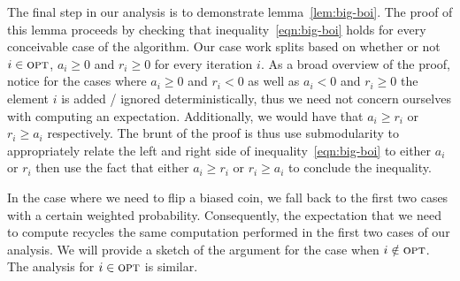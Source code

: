 \documentclass{article}
\begin{document}
The final step in our analysis is to demonstrate lemma~\ref{lem:big-boi}. The proof of this lemma proceeds by checking that inequality~\ref{eqn:big-boi} holds for every conceivable case of the algorithm. Our case work splits based on whether or not $i \in \textup{\textsc{opt}}$, $a_i \geq 0$ and $r_i \geq 0$ for every iteration $i$. As a broad overview of the proof, notice for the cases where $a_i \geq 0$ and $r_i < 0$ as well as $a_i < 0$ and $r_i \geq 0$ the element $i$ is added / ignored deterministically, thus we need not concern ourselves with computing an expectation. Additionally, we would have that $a_i \geq r_i$ or $r_i \geq a_i$ respectively. The brunt of the proof is thus use submodularity to appropriately relate the left and right side of inequality~\ref{eqn:big-boi} to either $a_i$ or $r_i$ then use the fact that either $a_i \geq r_i$ or $r_i \geq a_i$ to conclude the inequality.

In the case where we need to flip a biased coin, we fall back to the first two cases with a certain weighted probability. Consequently, the expectation that we need to compute recycles the same computation performed in the first two cases of our analysis. We will provide a sketch of the argument for the case when $i \notin \textup{\textsc{opt}}$. The analysis for $i \in \textup{\textsc{opt}}$ is similar.
\end{document}
